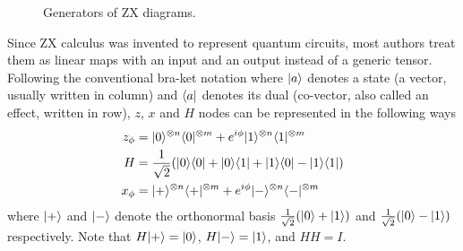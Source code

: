 \begin{figure}[ht]
	\centering
	
	\caption{Generators of ZX diagrams.}
	\label{fig:zx_generators}
\end{figure}

Since ZX calculus was invented to represent quantum circuits, most authors treat them as linear maps with an input and an output instead of a generic tensor.
Following the conventional bra-ket notation where $| a \rangle$ denotes a state (a vector, usually written in column) and $\langle a |$ denotes its dual (co-vector, also called an effect, written in row), $z$, $x$ and $H$ nodes can be represented in the following ways
\begin{align*}
	z_{\phi} &= | 0 \rangle^{\otimes n}\langle 0 |^{\otimes m} + e^{i \phi} | 1 \rangle^{\otimes n}\langle 1 |^{\otimes m} \\
	H &=\frac{1}{\sqrt{2}}(| 0 \rangle\langle 0 | + | 0 \rangle\langle 1 | + | 1 \rangle\langle 0 | - | 1 \rangle\langle 1 |) \\
	x_{\phi} &=  | + \rangle^{\otimes n}\langle + |^{\otimes m} + e^{i \phi} | - \rangle^{\otimes n}\langle - |^{\otimes m}
\end{align*}
where $| + \rangle$ and $| - \rangle$ denote the orthonormal basis $\frac{1}{\sqrt{2}}(| 0 \rangle + | 1 \rangle)$ and $\frac{1}{\sqrt{2}}(| 0 \rangle - | 1 \rangle)$ respectively.
Note that $H| + \rangle = | 0 \rangle$, $H| - \rangle = | 1 \rangle$, and $HH = I$.

